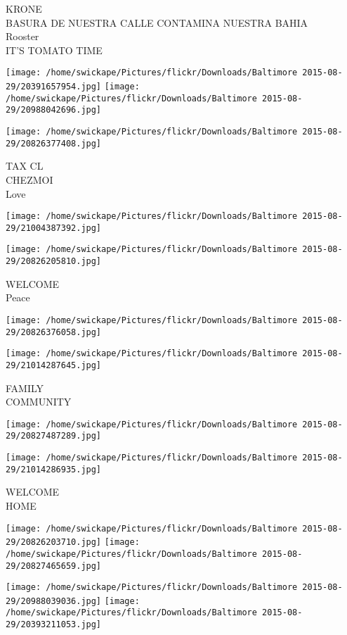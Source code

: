 \documentclass[10pt,letterpaper]{article}
\begin{document}
KRONE\\
BASURA DE NUESTRA CALLE CONTAMINA NUESTRA BAHIA\\
Rooster\\
IT'S TOMATO TIME
\pagebreak

\texttt{[image: /home/swickape/Pictures/flickr/Downloads/Baltimore 2015-08-29/20391657954.jpg]}
\texttt{[image: /home/swickape/Pictures/flickr/Downloads/Baltimore 2015-08-29/20988042696.jpg]}

\texttt{[image: /home/swickape/Pictures/flickr/Downloads/Baltimore 2015-08-29/20826377408.jpg]}

TAX CL\\
CHEZMOI\\
Love
\pagebreak

\texttt{[image: /home/swickape/Pictures/flickr/Downloads/Baltimore 2015-08-29/21004387392.jpg]}

\vspace{0.25in}
\texttt{[image: /home/swickape/Pictures/flickr/Downloads/Baltimore 2015-08-29/20826205810.jpg]}

WELCOME\\
Peace
\pagebreak

\texttt{[image: /home/swickape/Pictures/flickr/Downloads/Baltimore 2015-08-29/20826376058.jpg]}

\vspace{0.25in}
\texttt{[image: /home/swickape/Pictures/flickr/Downloads/Baltimore 2015-08-29/21014287645.jpg]}

FAMILY\\
COMMUNITY
\pagebreak

\texttt{[image: /home/swickape/Pictures/flickr/Downloads/Baltimore 2015-08-29/20827487289.jpg]}

\vspace{0.25in}
\texttt{[image: /home/swickape/Pictures/flickr/Downloads/Baltimore 2015-08-29/21014286935.jpg]}

WELCOME\\
HOME
\pagebreak

\texttt{[image: /home/swickape/Pictures/flickr/Downloads/Baltimore 2015-08-29/20826203710.jpg]}
\texttt{[image: /home/swickape/Pictures/flickr/Downloads/Baltimore 2015-08-29/20827465659.jpg]}

\texttt{[image: /home/swickape/Pictures/flickr/Downloads/Baltimore 2015-08-29/20988039036.jpg]}
\texttt{[image: /home/swickape/Pictures/flickr/Downloads/Baltimore 2015-08-29/20393211053.jpg]}
\end{document}
